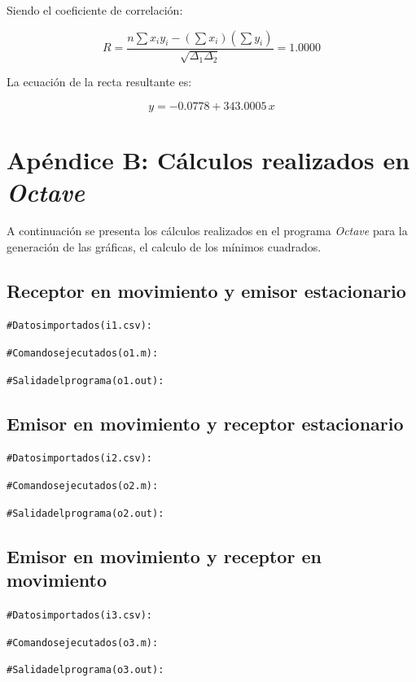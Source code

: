 \documentclass[letter,11pt]{article}
\begin{document}
Siendo el coeficiente de correlación:

\begin{equation*}
    R = \frac{n \sum x_i y_i - (\sum x_i)(\sum y_i)}{\sqrt{\Delta_1 \Delta_2}}
      = 1.0000
\end{equation*}
\vspace{0.10cm}

La ecuación de la recta resultante es:

\begin{equation*}
    y = -0.0778 + 343.0005\,x
\end{equation*}
\vspace{0.10cm}

\newpage
\section*{Apéndice B: Cálculos realizados en \emph{Octave}}

A continuación se presenta los cálculos realizados en el programa \emph{Octave}
para la generación de las gráficas, el calculo de los mínimos cuadrados.

\subsection{Receptor en movimiento y emisor estacionario}
\begin{shaded}
\begin{alltt}
\footnotesize
\# Datos importados (i1.csv):

\# Comandos ejecutados (o1.m):



\# Salida del programa (o1.out):

\normalsize
\end{alltt}
\end{shaded}

\subsection{Emisor en movimiento y receptor estacionario}
\begin{shaded}
\begin{alltt}
\footnotesize
\# Datos importados (i2.csv):

\# Comandos ejecutados (o2.m):



\# Salida del programa (o2.out):

\normalsize
\end{alltt}
\end{shaded}

\subsection{Emisor en movimiento y receptor en movimiento}
\begin{shaded}
\begin{alltt}
\footnotesize
\# Datos importados (i3.csv):

\# Comandos ejecutados (o3.m):



\# Salida del programa (o3.out):

\normalsize
\end{alltt}
\end{shaded}
\end{document}
